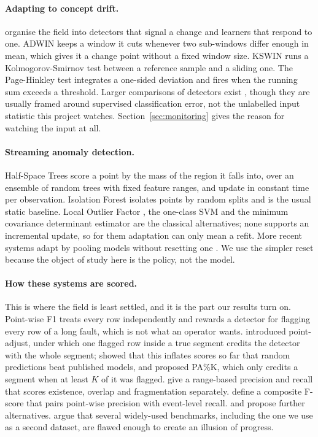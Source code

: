 \documentclass[11pt,a4paper]{article}
\begin{document}
\paragraph{Adapting to concept drift.} \citet{gama2014survey} organise the field
into detectors that signal a change and learners that respond to one. ADWIN
\citep{bifet2007adwin} keeps a window it cuts whenever two sub-windows differ
enough in mean, which gives it a change point without a fixed window size.
KSWIN \citep{raab2020kswin} runs a Kolmogorov-Smirnov test between a reference
sample and a sliding one. The Page-Hinkley test \citep{page1954cusum} integrates
a one-sided deviation and fires when the running sum exceeds a threshold. Larger
comparisons of detectors exist \citep{barros2018largescale}, though they are
usually framed around supervised classification error, not the unlabelled
input statistic this project watches. Section~\ref{sec:monitoring} gives the
reason for watching the input at all.

\paragraph{Streaming anomaly detection.} Half-Space Trees \citep{tan2011hst}
score a point by the mass of the region it falls into, over an ensemble of
random trees with fixed feature ranges, and update in constant time per
observation. Isolation Forest \citep{liu2008iforest} isolates points by random
splits and is the usual static baseline. Local Outlier Factor
\citep{breunig2000lof}, the one-class SVM \citep{scholkopf2001ocsvm} and the
minimum covariance determinant estimator \citep{rousseeuw1999mcd} are the
classical alternatives; none supports an incremental update, so for them
adaptation can only mean a refit. More recent systems adapt by pooling models
without resetting one \citep{yoon2022arcus}. We use the simpler reset
because the object of study here is the policy, not the model.

\paragraph{How these systems are scored.} This is where the field is least
settled, and it is the part our results turn on. Point-wise F1 treats every row
independently and rewards a detector for flagging every row of a long fault,
which is not what an operator wants. \citet{xu2018donut} introduced point-adjust,
under which one flagged row inside a true segment credits the detector with the
whole segment; \citet{kim2022rigorous} showed that this inflates scores so far
that random predictions beat published models, and proposed PA\%K, which only
credits a segment when at least $K$ of it was flagged. \citet{tatbul2018range}
give a range-based precision and recall that scores existence, overlap and
fragmentation separately. \citet{garg2021evaluation} define a composite
F-score that pairs point-wise precision with event-level recall.
\citet{paparrizos2022vus} and \citet{huet2022affiliation} propose further
alternatives. \citet{wu2023flawed} argue that several widely-used benchmarks,
including the one we use as a second dataset, are flawed enough to create an
illusion of progress.
\end{document}
